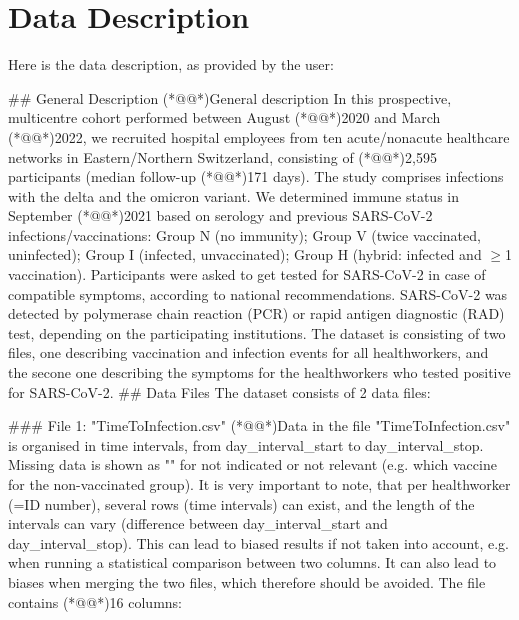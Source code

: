 \documentclass[11pt]{article}
\begin{document}
\clearpage
\appendix

\section{Data Description} \label{sec:data_description} Here is the data description, as provided by the user:

\begin{codeoutput}
\#\# General Description
(*@@*)General description 
In this prospective, multicentre cohort performed between August (*@@*)2020 and March (*@@*)2022, we recruited hospital employees from ten acute/nonacute healthcare networks in Eastern/Northern Switzerland, consisting of (*@@*)2,595 participants (median follow-up (*@@*)171 days). The study comprises infections with the delta and the omicron variant. We determined immune status in September (*@@*)2021 based on serology and previous SARS-CoV-2 infections/vaccinations: Group N (no immunity); Group V (twice vaccinated, uninfected); Group I (infected, unvaccinated); Group H (hybrid: infected and $\geq$1 vaccination). Participants were asked to get tested for SARS-CoV-2 in case of compatible symptoms, according to national recommendations. SARS-CoV-2 was detected by polymerase chain reaction (PCR) or rapid antigen diagnostic (RAD) test, depending on the participating institutions. The dataset is consisting of two files, one describing vaccination and infection events for all healthworkers, and the secone one describing the symptoms for the healthworkers who tested positive for SARS-CoV-2.
\#\# Data Files
The dataset consists of 2 data files:

\#\#\# File 1: "TimeToInfection.csv"
(*@@*)Data in the file "TimeToInfection.csv" is organised in time intervals, from day\_interval\_start to day\_interval\_stop. Missing data is shown as "" for not indicated or not relevant (e.g. which vaccine for the non-vaccinated group). It is very important to note, that per healthworker (=ID number), several rows (time intervals) can exist, and the length of the intervals can vary (difference between day\_interval\_start and day\_interval\_stop). This can lead to biased results if not taken into account, e.g. when running a statistical comparison between two columns. It can also lead to biases when merging the two files, which therefore should be avoided. The file contains (*@@*)16 columns:


\end{codeoutput}
\end{document}
